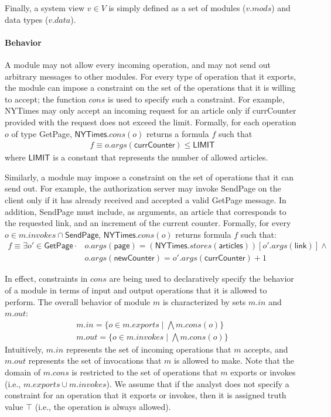 Finally, a system view $v \in V$ is simply defined as a set of modules
($v.mods$) and data types ($v.data$). 

\paragraph{\textbf{Behavior}} A module may not allow every incoming
operation, and may not send out arbitrary messages to other
modules. For every type of operation that it exports, the module can
impose a constraint on the set of the operations that it is willing to
accept; the function $cons$ is used to specify such a constraint. For
example, \textsf{NYTimes} may only accept an incoming request for an
article only if \textsf{currCounter} provided with the request does
not exceed the limit. Formally, for each operation $o$ of type
\textsf{GetPage}, $\textsf{NYTimes}.cons(o)$ returns a formula $f$
such that
\begin{align*}
f \equiv o.args(\textsf{currCounter}) \leq \textsf{LIMIT}
\end{align*}
where $\textsf{LIMIT}$ is a constant that represents the number of
allowed articles.

Similarly, a module may impose a constraint on the set of operations
that it can send out. For example, the authorization server may invoke
\textsf{SendPage} on the client only if it has already received and
accepted a valid \textsf{GetPage} message. In addition,
\textsf{SendPage} must include, as arguments, an article that
corresponds to the requested link, and an increment of the current
counter. Formally, for every $o \in m.invokes \cap \textsf{SendPage}$,
$\textsf{NYTimes}.cons(o)$ returns formula $f$ such that:
\begin{align*}
f \equiv \exists o' \in \textsf{GetPage} \cdot & o.args(\textsf{page}) =
(\textsf{NYTimes}.stores(\textsf{articles}))[o'.args(\textsf{link})]
\land \\
& o.args(\textsf{newCounter}) = o'.args(\textsf{currCounter}) + 1
\end{align*}

In effect, constraints in $cons$ are being used to
declaratively specify the behavior of a module in terms of input and
output operations that it is allowed to perform. The overall behavior
of module $m$ is characterized by sets $m.in$ and $m.out$:
\begin{align*}
m.in = \{ o \in m.exports \;|\; \bigwedge m.cons(o) \} \\
m.out = \{ o \in m.invokes \;|\; \bigwedge m.cons(o) \}
\end{align*}
Intuitively, $m.in$ represents the set of incoming operations that $m$
accepts, and $m.out$ represents the set of invocations that $m$ is
allowed to make. Note that the domain of $m.cons$ is restricted to
the set of operations that $m$ exports or invokes (i.e., $m.exports
\cup m.invokes$). We assume that if the analyst does not specify a
constraint for an operation that it exports or invokes,
then it is assigned truth value $\top$ (i.e., the operation is always
allowed).
